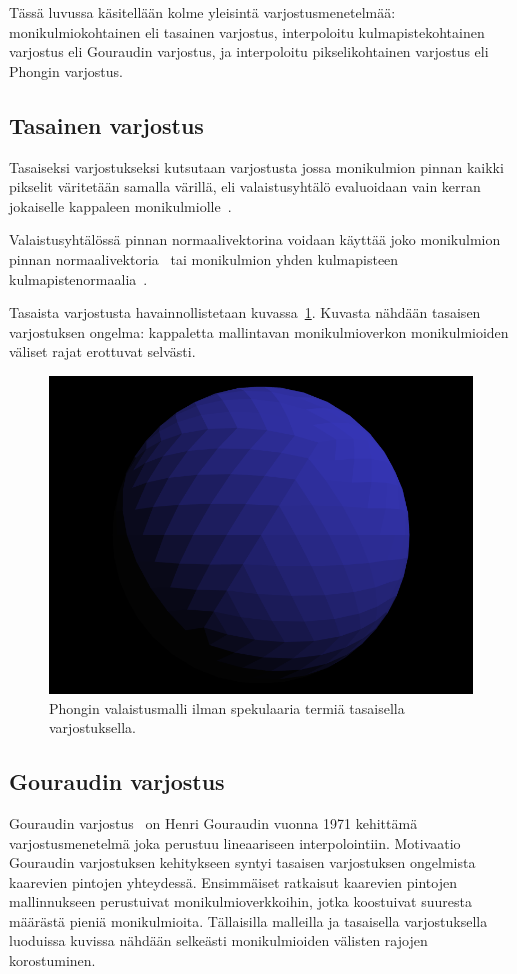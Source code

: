 \documentclass[finnish]{tktltiki2}
\theoremstyle{definition}
\theoremstyle{remark}
\begin{document}
Tässä luvussa käsitellään kolme yleisintä varjostusmenetelmää: monikulmiokohtainen eli tasainen varjostus, interpoloitu kulmapistekohtainen varjostus eli Gouraudin varjostus, ja interpoloitu pikselikohtainen varjostus eli Phongin varjostus.

\subsection{Tasainen varjostus}
Tasaiseksi varjostukseksi kutsutaan varjostusta jossa monikulmion pinnan kaikki pikselit väritetään samalla värillä, eli valaistusyhtälö evaluoidaan vain kerran jokaiselle kappaleen monikulmiolle~\cite[s. 113, 155]{Moller}.

Valaistusyhtälössä pinnan normaalivektorina voidaan käyttää joko monikulmion pinnan normaalivektoria~\cite{Warnock} tai monikulmion yhden kulmapisteen kulmapistenormaalia~\cite[s.127]{Hughes}.

Tasaista varjostusta havainnollistetaan kuvassa~\ref{fig:Tasainen_varjostus}. Kuvasta nähdään tasaisen varjostuksen ongelma: kappaletta mallintavan monikulmioverkon monikulmioiden väliset rajat erottuvat selvästi.

\begin{figure}[h]
\centering
\includegraphics[scale=0.6]{img/flat_shading_crop.png}
\caption{Phongin valaistusmalli ilman spekulaaria termiä tasaisella varjostuksella.}
\label{fig:Tasainen_varjostus}
\end{figure}

\subsection{Gouraudin varjostus}
Gouraudin varjostus~\cite{Gouraud} on Henri Gouraudin vuonna 1971 kehittämä varjostusmenetelmä joka perustuu lineaariseen interpolointiin. Motivaatio Gouraudin varjostuksen kehitykseen syntyi tasaisen varjostuksen ongelmista kaarevien pintojen yhteydessä. Ensimmäiset ratkaisut kaarevien pintojen mallinnukseen perustuivat monikulmioverkkoihin, jotka koostuivat suuresta määrästä pieniä monikulmioita. Tällaisilla malleilla ja tasaisella varjostuksella luoduissa kuvissa nähdään selkeästi monikulmioiden välisten rajojen korostuminen.
\end{document}
